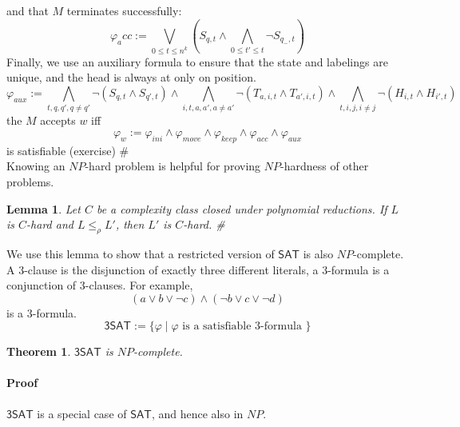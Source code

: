 \documentclass{report}
\newtheorem{theorem}[definition]{Theorem}
\newtheorem{lemma}[definition]{Lemma}
\begin{document}
and that $M$ terminates successfully:
\[
\varphi_acc := \bigvee_{0\leq t\leq n^k}(S_{q,t} \land \bigwedge_{0\leq t'\leq t}\neg S_{q_-,t})
\]
Finally, we use an auxiliary formula to ensure that the state and labelings are unique, and the head is always at only on position.
\[
\varphi_{aux} := \bigwedge_{t,q,q',q\neq q'}\neg(S_{q,t} \land S_{q',t}) \land \bigwedge_{i,t,a,a',a\neq a'}\neg (T_{a,i,t} \land T_{a',i,t}) \land \bigwedge_{t,i,j,i\neq j}\neg (H_{i,t} \land H_{i',t})
\]
the $M$ accepts $w$ iff
\[\varphi_w := \varphi_{ini} \land \varphi_{move} \land \varphi_{keep} \land \varphi_{acc} \land \varphi_{aux}\]
is satisfiable (exercise) $\#$\\

Knowing an $NP$-hard problem is helpful for proving $NP$-hardness of other problems.

\begin{lemma}Let $C$ be a complexity class closed under polynomial reductions. If $L$ is $C$-hard and $L \leq_\rho L'$, then $L'$ is $C$-hard. \#
\end{lemma}\noindent
We use this lemma to show that a restricted version of $\mathsf{SAT}$ is also $NP$-complete. A $3$-clause is the disjunction of exactly three different literals, a $3$-formula is a conjunction of $3$-clauses. For example, 
\[ (a \lor b \lor \neg c) \land (\neg b \lor c \lor \neg d)\]
is a $3$-formula.
\[  \mathsf{3SAT} := \{ \varphi\;|\;\varphi \text{ is a satisfiable 3-formula }\} \]

\begin{theorem}$\mathsf{3SAT}$ is $NP$-complete.
\end{theorem}

\paragraph{Proof} $\mathsf{3SAT}$ is a special case of $\mathsf{SAT}$, and hence also in $NP$.
\end{document}
